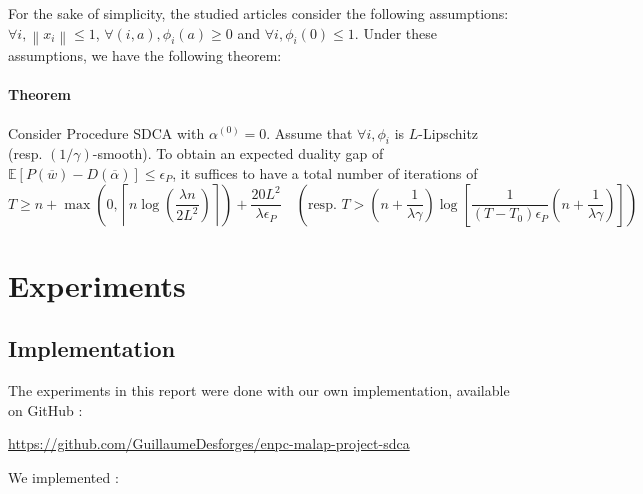 \documentclass{article}
\newcommand{\norm}[1]{\left\|#1 \right\|}
\begin{document}
For the sake of simplicity, the studied articles consider the following assumptions: $\forall i, \norm{x_i} \leq 1$, $\forall (i,a), \phi_i(a) \geq 0$ and $\forall i, \phi_i(0) \leq 1$.
Under these assumptions, we have the following theorem:

\paragraph{Theorem} Consider Procedure SDCA with $\alpha^{(0)} = 0$.
Assume that $\forall i, \phi_i$ is $L$-Lipschitz (resp. $(1/\gamma)$-smooth).
To obtain an expected duality gap of $\mathbb{E}[P(\overline{w})-D(\overline{\alpha})] \leq \epsilon_P$, it suffices to have a total number of iterations of
$$T \geq n + \max\left(0, \left\lceil n \log \left(\dfrac{\lambda n}{2 L^2} \right) \right\rceil \right) + \dfrac{20 L^2}{\lambda \epsilon_P} \quad \left( \text{resp. } T > \left(n + \dfrac{1}{\lambda \gamma} \right) \log \left[ \dfrac{1}{(T-T_0)\epsilon_P} \left(n + \dfrac{1}{\lambda \gamma} \right) \right] \right)$$ 


\section{Experiments}

\subsection{Implementation}

The experiments in this report were done with our own implementation, available on GitHub :

\url{ https://github.com/GuillaumeDesforges/enpc-malap-project-sdca }

We implemented :
\end{document}
